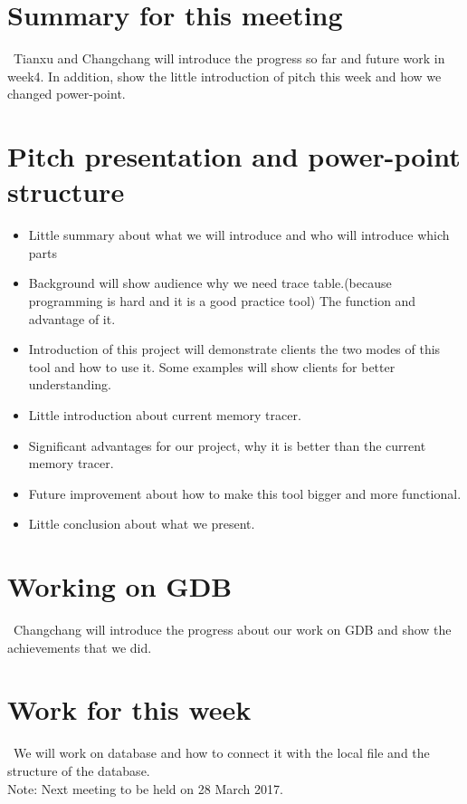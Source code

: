 \documentclass[11pt, a4paper]{article}
\begin{document}
\section{Summary for this meeting}
\ Tianxu and Changchang will introduce the progress so far and future work in week4. In addition, show the little introduction of pitch this week and how we changed power-point.\\
\section{Pitch presentation and power-point structure}
\begin {itemize} 
\item Little summary about what we will introduce and who will introduce which parts
\item Background will show audience why we need trace table.(because programming is hard and it is a good practice tool) The function and advantage of it. 
\item Introduction of this project will demonstrate clients the two modes of this tool and how to use it. Some examples will show clients for better understanding.
\item Little introduction about current memory tracer.
\item Significant advantages for our project, why it is better than the current memory tracer.
\item Future improvement about how to make this tool bigger and more functional.
\item Little conclusion about what we present.

\end {itemize}


\section{Working on GDB}
\ Changchang will introduce the progress about our work on GDB and show the achievements that we did. \\

\section{Work for this week}
\ We will work on database and how to connect it with the local file and the structure of the database.  \\


\vspace*{10pt}
\noindent Note: Next meeting to be held on 28 March 2017.
\end{document}
